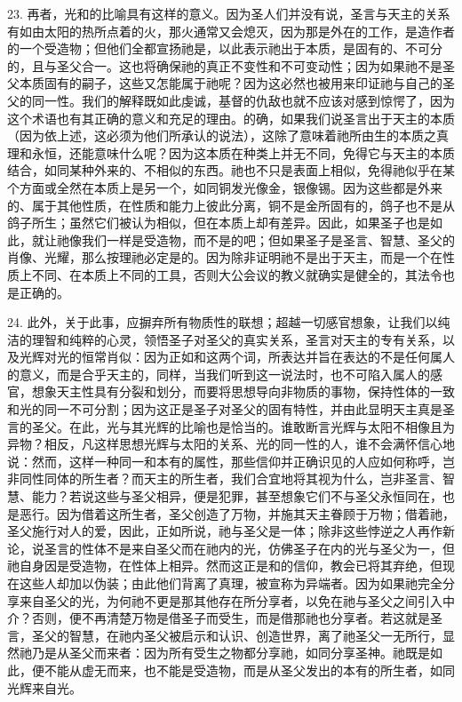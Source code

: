 23. 再者，光和的比喻具有这样的意义。因为圣人们并没有说，圣言与天主的关系有如由太阳的热所点着的火，那火通常又会熄灭，因为那是外在的工作，是造作者的一个受造物；但他们全都宣扬祂是，以此表示祂出于本质，是固有的、不可分的，且与圣父合一。这也将确保祂的真正不变性和不可变动性；因为如果祂不是圣父本质固有的嗣子，这些又怎能属于祂呢？因为这必然也被用来印证祂与自己的圣父的同一性。我们的解释既如此虔诚，基督的仇敌也就不应该对感到惊愕了，因为这个术语也有其正确的意义和充足的理由。的确，如果我们说圣言出于天主的本质（因为依上述，这必须为他们所承认的说法），这除了意味着祂所由生的本质之真理和永恒，还能意味什么呢？因为这本质在种类上并无不同，免得它与天主的本质结合，如同某种外来的、不相似的东西。祂也不只是表面上相似，免得祂似乎在某个方面或全然在本质上是另一个，如同铜发光像金，银像锡。因为这些都是外来的、属于其他性质，在性质和能力上彼此分离，铜不是金所固有的，鸽子也不是从鸽子所生；虽然它们被认为相似，但在本质上却有差异。因此，如果圣子也是如此，就让祂像我们一样是受造物，而不是的吧；但如果圣子是圣言、智慧、圣父的肖像、光耀，那么按理祂必定是的。因为除非证明祂不是出于天主，而是一个在性质上不同、在本质上不同的工具，否则大公会议的教义就确实是健全的，其法令也是正确的。\par

24. 此外，关于此事，应摒弃所有物质性的联想；超越一切感官想象，让我们以纯洁的理智和纯粹的心灵，领悟圣子对圣父的真实关系，圣言对天主的专有关系，以及光辉对光的恒常肖似：因为正如和这两个词，所表达并旨在表达的不是任何属人的意义，而是合乎天主的，同样，当我们听到这一说法时，也不可陷入属人的感官，想象天主性具有分裂和划分，而要将思想导向非物质的事物，保持性体的一致和光的同一不可分割；因为这正是圣子对圣父的固有特性，并由此显明天主真是圣言的圣父。在此，光与其光辉的比喻也是恰当的。谁敢断言光辉与太阳不相像且为异物？相反，凡这样思想光辉与太阳的关系、光的同一性的人，谁不会满怀信心地说：然而，这样一种同一和本有的属性，那些信仰并正确识见的人应如何称呼，岂非同性同体的所生者？而天主的所生者，我们合宜地将其视为什么，岂非圣言、智慧、能力？若说这些与圣父相异，便是犯罪，甚至想象它们不与圣父永恒同在，也是恶行。因为借着这所生者，圣父创造了万物，并施其天主眷顾于万物；借着祂，圣父施行对人的爱，因此，正如所说，祂与圣父是一体；除非这些悖逆之人再作新论，说圣言的性体不是来自圣父而在祂内的光，仿佛圣子在内的光与圣父为一，但祂自身因是受造物，在性体上相异。然而这正是和的信仰，教会已将其弃绝，但现在这些人却加以伪装；由此他们背离了真理，被宣称为异端者。因为如果祂完全分享来自圣父的光，为何祂不更是那其他存在所分享者，以免在祂与圣父之间引入中介？否则，便不再清楚万物是借圣子而受生，而是借那祂也分享者。若这就是圣言，圣父的智慧，在祂内圣父被启示和认识、创造世界，离了祂圣父一无所行，显然祂乃是从圣父而来者：因为所有受生之物都分享祂，如同分享圣神。祂既是如此，便不能从虚无而来，也不能是受造物，而是从圣父发出的本有的所生者，如同光辉来自光。\par

